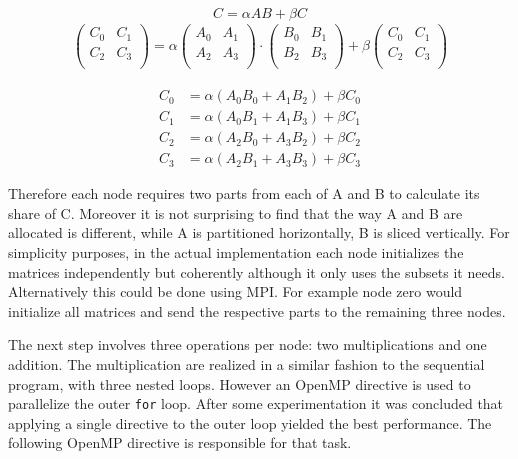 \begin{equation}
C = \alpha AB + \beta C
\end{equation}
\begin{align}
    \begin{pmatrix}
      C_0 & C_1 \\
      C_2 & C_3 \\
    \end{pmatrix}
= \alpha
    \begin{pmatrix}
      A_0 & A_1 \\
      A_2 & A_3 \\
    \end{pmatrix}
\cdot
    \begin{pmatrix}
      B_0 & B_1 \\
      B_2 & B_3 \\
    \end{pmatrix}
+ \beta
    \begin{pmatrix}
      C_0 & C_1 \\
      C_2 & C_3 \\
    \end{pmatrix}
\label{eq:partition}
\end{align}

\begin{align}
C_0 &= \alpha (A_0 B_0 + A_1 B_2) + \beta C_0\\
C_1 &= \alpha (A_0 B_1 + A_1 B_3) + \beta C_1\\
C_2 &= \alpha (A_2 B_0 + A_3 B_2) + \beta C_2\\
C_3 &= \alpha (A_2 B_1 + A_3 B_3) + \beta C_3
\end{align}

Therefore each node requires two parts from each of A and B to calculate its share of C. Moreover it is not surprising to find that the way A and B are allocated is different, while A is partitioned horizontally, B is sliced vertically. For simplicity purposes, in the actual implementation each node initializes the matrices independently but coherently although it only uses the subsets it needs. Alternatively this could be done using MPI. For example node zero would initialize all matrices and send the respective parts to the remaining three nodes.

The next step involves three operations per node: two multiplications and one addition. The multiplication are realized in a similar fashion to the sequential program, \ie with three nested loops. However an OpenMP directive is used to parallelize the outer \texttt{for} loop. After some experimentation it was concluded that applying a single directive to the outer loop yielded the best performance.
The following OpenMP directive is responsible for that task.

